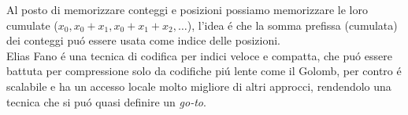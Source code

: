 Al posto di memorizzare conteggi e posizioni possiamo memorizzare le loro cumulate ($x_0, x_0 + x_1, x_0 + x_1 + x_2, \dots$), l'idea é che la somma prefissa (cumulata) dei conteggi puó essere usata come indice delle posizioni.\\
Elias Fano é una tecnica di codifica per indici veloce e compatta, che puó essere battuta per compressione solo da codifiche piú lente come il Golomb, per contro é scalabile e ha un accesso locale molto migliore di altri approcci, rendendolo una tecnica che si puó quasi definire un \textit{go-to}.